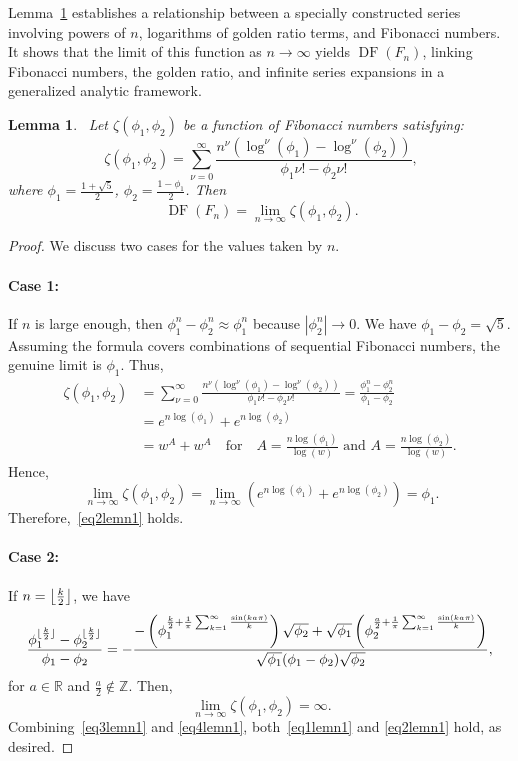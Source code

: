 \documentclass[11pt, a4paper]{article}
\DeclarePairedDelimiter\floor{\lfloor}{\rfloor}
\newcommand{\case}[1]{\paragraph*{Case #1:}}
\newtheorem{lemma}[theorem]{Lemma}
\theoremstyle{definition}
\begin{document}
Lemma~\ref{lemn1} establishes a relationship between a specially constructed series involving powers of $n$, logarithms of golden ratio terms, and Fibonacci numbers. It shows that the limit of this function as $n \to \infty$ yields $\operatorname{DF}(F_n)$, linking Fibonacci numbers, the golden ratio, and infinite series expansions in a generalized analytic framework.

\begin{lemma}~\label{lemn1}
Let $\zeta(\phi_1,\phi_2)$ be a function of Fibonacci numbers satisfying:
\begin{equation}~\label{eq1lemn1}
\zeta(\phi_1,\phi_2) = \sum_{\nu=0}^{\infty} \frac{n^\nu (\log^\nu(\phi_1) - \log^\nu(\phi_2))}{\phi_1 \nu! - \phi_2 \nu!},
\end{equation}
where $\phi_1 = \frac{1 + \sqrt{5}}{2}$, $\phi_2 = \frac{1 - \phi_1}{2}$. Then 
\begin{equation}~\label{eq2lemn1}
\operatorname{DF}(F_n) = \lim_{n \to \infty} \zeta(\phi_1, \phi_2).
\end{equation}
\end{lemma}

\begin{proof}
We discuss two cases for the values taken by $n$.

\case{1}
If $n$ is large enough, then $\phi_1^n - \phi_2^n \approx \phi_1^n$ because $|\phi_2^n| \to 0$. We have $\phi_1 - \phi_2 = \sqrt{5}$. Assuming the formula covers combinations of sequential Fibonacci numbers, the genuine limit is $\phi_1$. Thus,
\begin{align*}
\zeta(\phi_1, \phi_2) &= \sum_{\nu=0}^{\infty} \frac{n^\nu (\log^\nu(\phi_1) - \log^\nu(\phi_2))}{\phi_1 \nu! - \phi_2 \nu!} = \frac{\phi_1^n - \phi_2^n}{\phi_1 - \phi_2} \\
&= e^{n \log(\phi_1)} + e^{n \log(\phi_2)} \\
&= w^A + w^A \quad \text{for} \quad A = \frac{n \log(\phi_1)}{\log(w)} \text{ and } A = \frac{n \log(\phi_2)}{\log(w)}.
\end{align*}
Hence,
\begin{equation}~\label{eq3lemn1}
\lim_{n \to \infty} \zeta(\phi_1, \phi_2) = \lim_{n \to \infty} \left( e^{n \log(\phi_1)} + e^{n \log(\phi_2)} \right) = \phi_1.
\end{equation}
Therefore,~\eqref{eq2lemn1} holds.

\case{2}
If $n=\floor*{\frac{k}{2}}$, we have
\[
\frac{\phi_1^{\floor{\frac{k}{2}}} - \phi_2^{\floor{\frac{k}{2}}}}{\phi_1 - \phi_2} = -\frac{-\left(\phi_1^{\frac{k}{2} + \frac{1}{\pi} \sum_{k=1}^\infty \frac{\sin(ka\pi)}{k}}\right) \sqrt{\phi_2} + \sqrt{\phi_1} \left(\phi_2^{\frac{a}{2} + \frac{1}{\pi} \sum_{k=1}^\infty \frac{\sin(ka\pi)}{k}}\right)}{\sqrt{\phi_1} (\phi_1 - \phi_2) \sqrt{\phi_2}},
\]
for $a \in \mathbb{R}$ and $\frac{a}{2} \notin \mathbb{Z}$. Then,
\begin{equation}~\label{eq4lemn1}
\lim_{n \to \infty} \zeta(\phi_1, \phi_2) = \infty.
\end{equation}
Combining~\eqref{eq3lemn1} and \eqref{eq4lemn1}, both~\eqref{eq1lemn1} and \eqref{eq2lemn1} hold, as desired.
\end{proof}
\end{document}

